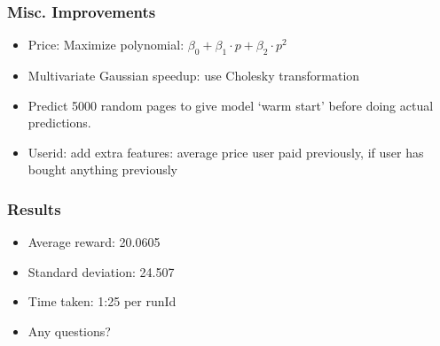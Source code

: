 \documentclass{beamer}
\begin{document}
\begin{frame}
	\frametitle{Misc. Improvements}
	\begin{itemize}
		\item Price: Maximize polynomial: $\beta_0 + \beta_1 \cdot p + \beta_2 \cdot p^2$ %
		\item Multivariate Gaussian speedup: use Cholesky transformation
		\item Predict 5000 random pages to give model `warm start' before doing actual predictions.
		\item Userid: add extra features: average price user paid previously, if user has bought anything previously
	\end{itemize}
\end{frame}


\begin{frame}
  \frametitle{Results}

  \begin{itemize}
    \item Average reward: 20.0605
    \item Standard deviation: 24.507
    \item Time taken: 1:25 per runId
    \item Any questions?
  \end{itemize}
\end{frame}
\end{document}
